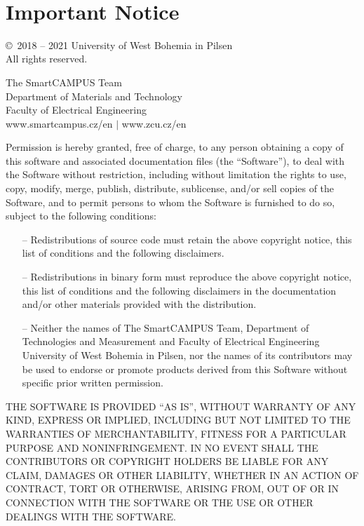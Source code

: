 %
%
%

\clearpage
\pagestyle{empty} 

~

\vfill

\section*{Important Notice}

\copyright ~2018 -- 2021 University of West Bohemia in Pilsen\\
All rights reserved.

The SmartCAMPUS Team\\
Department of Materials and Technology\\
Faculty of Electrical Engineering\\
www.smartcampus.cz/en $\mid$ www.zcu.cz/en


Permission is hereby granted, free of charge, to any person obtaining a copy of this software and associated documentation files (the “Software”), to deal with the Software without restriction, including without limitation the rights to use, copy, modify, merge, publish, distribute, sublicense, and/or sell copies of the Software, and to permit persons to whom the Software is furnished to do so, subject to the following conditions:

\begin{itemize}
    \item[--] Redistributions of source code must retain the above copyright notice, this list of conditions and the following disclaimers.
    \item[--] Redistributions in binary form must reproduce the above copyright notice, this list of conditions and the following disclaimers in the documentation and/or other materials provided with the distribution.
    \item[--] Neither the names of The SmartCAMPUS Team, Department of Technologies and Measurement and Faculty of Electrical Engineering University of West Bohemia in Pilsen, nor the names of its contributors may be used to endorse or promote products derived from this Software without specific prior written permission. 
\end{itemize}
THE SOFTWARE IS PROVIDED “AS IS”, WITHOUT WARRANTY OF ANY KIND, EXPRESS OR IMPLIED, INCLUDING BUT NOT LIMITED TO THE WARRANTIES OF MERCHANTABILITY, FITNESS FOR A PARTICULAR PURPOSE AND NONINFRINGEMENT. IN NO EVENT SHALL THE CONTRIBUTORS OR COPYRIGHT HOLDERS BE LIABLE FOR ANY CLAIM, DAMAGES OR OTHER LIABILITY, WHETHER IN AN ACTION OF CONTRACT, TORT OR OTHERWISE, ARISING FROM, OUT OF OR IN CONNECTION WITH THE SOFTWARE OR THE USE OR OTHER DEALINGS WITH THE SOFTWARE. 


